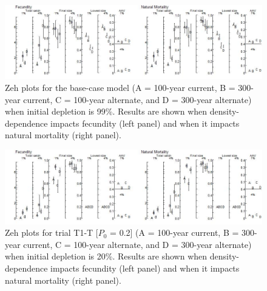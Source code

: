 \documentclass{article}\usepackage[]{graphicx}\usepackage[]{color}
\providecommand\phantomsection{}
\renewcommand{\thefigure}{\thesection(\alph{figure})}
\begin{document}
\begin{landscape}
\begin{figure}[H]
\centering
\includegraphics[]{SC66aRMP10_Part2_T1-D.jpeg}
\caption{
Zeh plots for the base-case model
(A = 100-year current, B = 300-year current, C = 100-year alternate, and D = 300-year alternate)
when initial depletion is 99\%.
Results are shown when density-dependence impacts fecundity (left panel) and when it impacts natural mortality (right panel).
}
\end{figure}

\clearpage
\phantomsection
\renewcommand{\thefigure}{\thesection}
\setcounter{figure}{0}


\begin{figure}[H]
\centering
\includegraphics[]{SC66aRMP10_Part2_T1-cC.jpeg}
\caption{
Zeh plots for trial T1-T
[$P_0 $ = 0.2]
(A = 100-year current, B = 300-year current, C = 100-year alternate, and D = 300-year alternate)
when initial depletion is 20\%.
Results are shown when density-dependence impacts fecundity (left panel) and when it impacts natural mortality (right panel).
}
\end{figure}

\phantomsection
{}
\setcounter{figure}{0}



\end{landscape}
\end{document}
